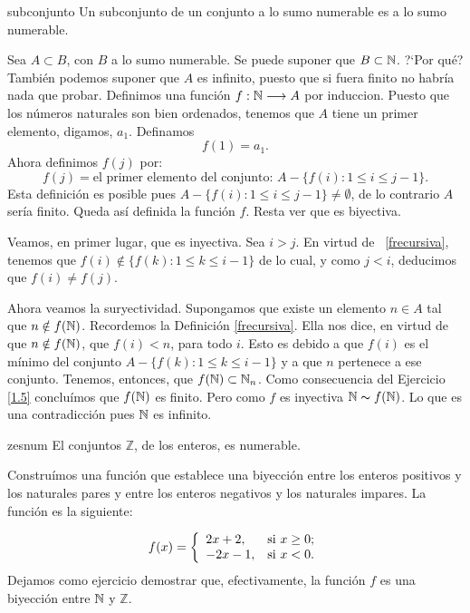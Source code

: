 \begin{proposicion}{subconjunto} Un subconjunto de un conjunto a lo sumo numerable es a
lo sumo numerable.
\end{proposicion}
\begin{demo} Sea $A\subset B$, con $B$ a lo sumo numerable. Se puede suponer
que $B\subset \mathbb{N}$. ?`Por qué? También podemos suponer que
$A$ es infinito, puesto que si fuera finito no habría nada
que probar. Definimos una función $f:\mathbb{N}\longrightarrow A$ por
induccion. Puesto que los números naturales son bien ordenados,
tenemos que $A$ tiene un primer elemento, digamos, $a_1$.
Definamos
\[f(1)=a_1.\]
Ahora definimos $f(j)$ por:
\begin{equation}\label{frecursiva}
f(j)=\text{el primer elemento del conjunto: }A-\{f(i):1\leq i\leq
j-1\}. \end{equation} Esta definición es posible pues
$A-\{f(i):1\leq i\leq j-1\}\neq\emptyset$, de lo contrario $A$
sería finito. Queda así definida la función $f$. Resta
ver que es biyectiva.

Veamos, en primer lugar, que es inyectiva. Sea $i>j$. En virtud de
~\eqref{frecursiva}, tenemos que $f(i)\notin\{f(k):1\leq k\leq
i-1\}$ de lo cual, y como $j<i$, deducimos que $f(i)\neq f(j)$.

Ahora veamos la suryectividad. Supongamos que existe un elemento
$n\in A$ tal que $n\notin f(\mathbb{N})$. Recordemos la Definición
\eqref{frecursiva}. Ella nos dice, en virtud de que $n\notin
f(\mathbb{N})$, que $f(i)<n$, para todo $i$. Esto es debido a que $f(i)$
es el mínimo del conjunto $ A-\{f(k):1\leq k\leq i-1\}$ y a
que $n$ pertenece a ese conjunto. Tenemos, entonces, que
$f(\mathbb{N})\subset\mathbb{N}_n$. Como consecuencia del Ejercicio \vref{1.5}
concluímos que $f(\mathbb{N})$ es finito. Pero como $f$ es inyectiva
$\mathbb{N}\thicksim f(\mathbb{N})$. Lo que es una contradicción pues $\mathbb{N}$ es
infinito.
\end{demo}

\begin{proposicion}{zesnum}
El conjuntos $\mathbb{Z}$, de los enteros,  es numerable.
\end{proposicion}
\begin{demo} Construímos una función que establece
una biyección entre los enteros positivos y los naturales pares
y entre los enteros negativos y los naturales impares. La
función es la siguiente:

\[f(x)=\left\{
\begin{array}{ll}
    2x+2, & \hbox{si $x\geq 0$;} \\
    -2x-1, & \hbox{si $x<0$.} \\
\end{array}
\right.\] Dejamos como ejercicio demostrar que, efectivamente, la
función $f$ es una biyección entre $\mathbb{N}$ y $\mathbb{Z}$.
\end{demo}

